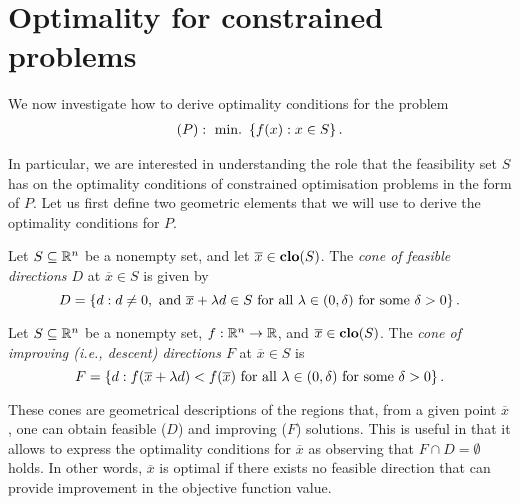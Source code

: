 \section{Optimality for constrained problems}

We now investigate how to derive optimality conditions for the problem
\begin{align*}
	(P): ~\mathop{\text{min.~}}\left\{ f(x) : x \in S \right \}.	
\end{align*}
 
In particular, we are interested in understanding the role that the feasibility set $S$ has on the optimality conditions of constrained optimisation problems in the form of $P$. Let us first define two geometric elements that we will use to derive the optimality conditions for $P$.
%
\begin{definition}
	Let $S \subseteq \mathbb{R}^n$ be a nonempty set, and let $\overline{x} \in \mathop{\bf clo}(S)$. The \emph{cone of feasible directions $D$} at $\overline{x}\in S$ is given by
	$$ 
	D = \left\{ d : d \neq 0, \text{ and } \overline{x} + \lambda d \in S \text{ for all } \lambda \in (0,\delta) \text{ for some } \delta > 0 \right \}.
	$$
\end{definition}

\begin{definition}
Let $S \subseteq \mathbb{R}^n$ be a nonempty set, $f: \mathbb{R}^n \rightarrow \mathbb{R}$, and $\overline{x} \in \mathop{\bf clo}(S)$. The \emph{cone of improving (i.e., descent) directions $F$} at $\overline{x}\in S$ is 
$$ F = \left\{ d : f(\overline{x} + \lambda d) < f(\overline{x}) \text{ for all } \lambda \in (0,\delta) \text{ for some } \delta > 0 \right \}.
$$
\end{definition}

These cones are geometrical descriptions of the regions that, from a given point $\overline{x}$, one can obtain feasible ($D$) and improving ($F$) solutions. This is useful in that it allows to express the optimality conditions for $\overline{x}$ as  observing that $F \cap D = \emptyset$ holds. In other words, $\overline{x}$ is optimal if there exists no feasible direction that can provide improvement in the objective function value.

